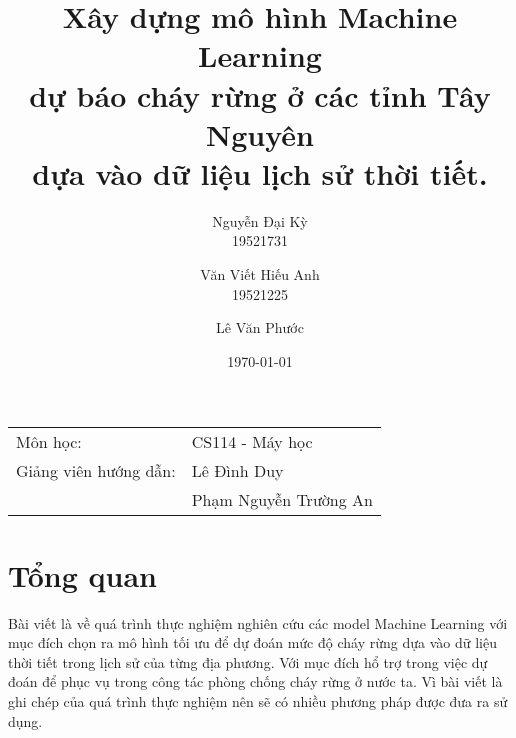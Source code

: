 \documentclass{article}
\begin{document}
\title{
      \LARGE{
            \textbf{
                  Xây dựng mô hình Machine Learning \\ dự báo cháy rừng ở các tỉnh Tây Nguyên \\ dựa vào dữ liệu lịch sử thời tiết.
            }
      }
}

\author{
      Nguyễn Đại Kỳ\\
      19521731\\
      \and
      Văn Viết Hiếu Anh\\
      19521225
      \and
      Lê Văn Phước\\

}

\date{\today} %
\maketitle %
\begin{center}
      \begin{tabular}{l l}
            Môn học:              & CS114 - Máy học       \\
            Giảng viên hướng dẫn: & Lê Đình Duy           \\
                                  & Phạm Nguyễn Trường An \\
      \end{tabular}
\end{center}

\tableofcontents

\pagebreak


\section{Tổng quan}
\qquad Bài viết là về quá trình thực nghiệm nghiên cứu các model Machine Learning với mục đích chọn ra mô hình tối ưu để dự đoán mức độ cháy rừng dựa vào dữ liệu thời tiết trong lịch sử của từng địa phương. Với mục đích hổ trợ trong việc dự đoán để phục vụ trong công tác phòng chống cháy rừng ở nước ta. Vì bài viết là ghi chép của quá trình thực nghiệm nên sẽ có nhiều phương pháp được đưa ra sử dụng.
\end{document}
